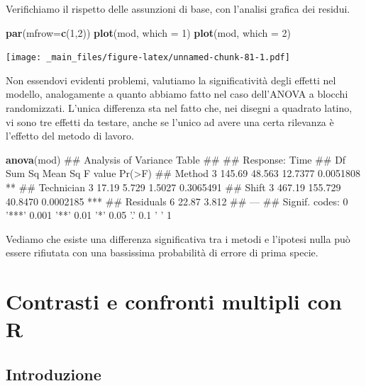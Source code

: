 \documentclass[a4paper,12pt,oneside]{book}
\newenvironment{Shaded}{\begin{snugshade}}{\end{snugshade}}
\newcommand{\KeywordTok}[1]{\textcolor[rgb]{0.13,0.29,0.53}{\textbf{#1}}}
\newcommand{\DataTypeTok}[1]{\textcolor[rgb]{0.13,0.29,0.53}{#1}}
\newcommand{\DecValTok}[1]{\textcolor[rgb]{0.00,0.00,0.81}{#1}}
\newcommand{\NormalTok}[1]{#1}
\theoremstyle{definition}
\theoremstyle{definition}
\theoremstyle{definition}
\theoremstyle{remark}
\begin{document}
Verifichiamo il rispetto delle assunzioni di base, con l'analisi grafica
dei residui.

\begin{Shaded}
\begin{Highlighting}[]
\KeywordTok{par}\NormalTok{(}\DataTypeTok{mfrow=}\KeywordTok{c}\NormalTok{(}\DecValTok{1}\NormalTok{,}\DecValTok{2}\NormalTok{))}
\KeywordTok{plot}\NormalTok{(mod, }\DataTypeTok{which =} \DecValTok{1}\NormalTok{)}
\KeywordTok{plot}\NormalTok{(mod, }\DataTypeTok{which =} \DecValTok{2}\NormalTok{)}
\end{Highlighting}
\end{Shaded}

\texttt{[image: \_main\_files/figure-latex/unnamed-chunk-81-1.pdf]}

Non essendovi evidenti problemi, valutiamo la significatività degli
effetti nel modello, analogamente a quanto abbiamo fatto nel caso
dell'ANOVA a blocchi randomizzati. L'unica differenza sta nel fatto che,
nei disegni a quadrato latino, vi sono tre effetti da testare, anche se
l'unico ad avere una certa rilevanza è l'effetto del metodo di lavoro.

\begin{Shaded}
\begin{Highlighting}[]
\KeywordTok{anova}\NormalTok{(mod)}
\NormalTok{## Analysis of Variance Table}
\NormalTok{## }
\NormalTok{## Response: Time}
\NormalTok{##            Df Sum Sq Mean Sq F value    Pr(>F)    }
\NormalTok{## Method      3 145.69  48.563 12.7377 0.0051808 ** }
\NormalTok{## Technician  3  17.19   5.729  1.5027 0.3065491    }
\NormalTok{## Shift       3 467.19 155.729 40.8470 0.0002185 ***}
\NormalTok{## Residuals   6  22.87   3.812                      }
\NormalTok{## ---}
\NormalTok{## Signif. codes:  0 '***' 0.001 '**' 0.01 '*' 0.05 '.' 0.1 ' ' 1}
\end{Highlighting}
\end{Shaded}

Vediamo che esiste una differenza significativa tra i metodi e l'ipotesi
nulla può essere rifiutata con una bassissima probabilità di errore di
prima specie.

\chapter{Contrasti e confronti multipli con
R}\label{contrasti-e-confronti-multipli-con-r}

\section{Introduzione}\label{introduzione-4}
\end{document}
